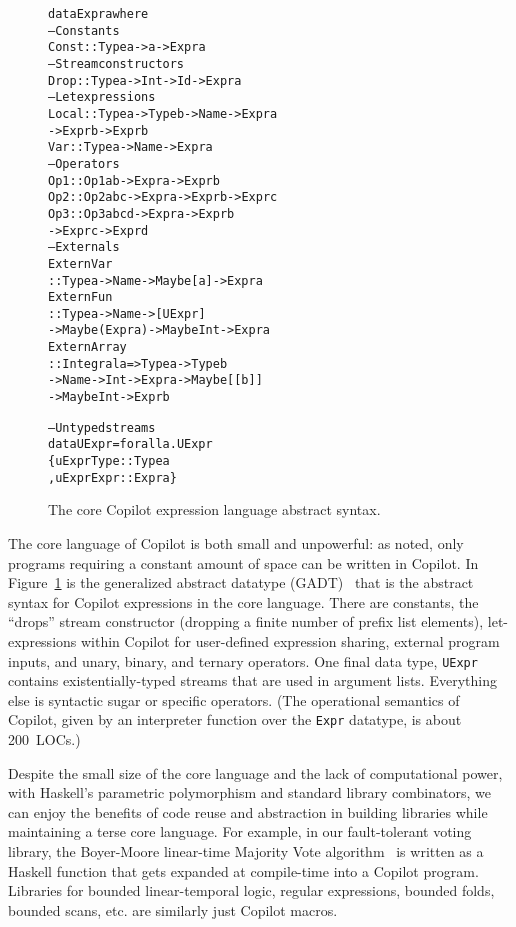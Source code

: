 \documentclass[9pt]{sigplanconf}
\newenvironment{code}{\begin{alltt}\footnotesize}{\end{alltt}}
\begin{document}
\begin{figure}[h!t]
  \begin{code}
data Expr a where
  -- Constants
  Const :: Type a -> a -> Expr a
  -- Stream constructors
  Drop  :: Type a -> Int -> Id -> Expr a
  -- Let expressions
  Local :: Type a -> Type b -> Name -> Expr a 
        -> Expr b -> Expr b
  Var   :: Type a -> Name -> Expr a 
  -- Operators
  Op1   :: Op1 a b -> Expr a -> Expr b 
  Op2   :: Op2 a b c -> Expr a -> Expr b -> Expr c
  Op3   :: Op3 a b c d -> Expr a -> Expr b 
        -> Expr c -> Expr d
  -- Externals
  ExternVar   
    :: Type a -> Name -> Maybe [a] -> Expr a 
  ExternFun   
    :: Type a -> Name -> [UExpr] 
    -> Maybe (Expr a) -> Maybe Int -> Expr a
  ExternArray 
    :: Integral a => Type a -> Type b 
    -> Name -> Int -> Expr a -> Maybe [[b]] 
    -> Maybe Int -> Expr b 

-- Untyped streams
data UExpr = forall a. UExpr
  \{ uExprType :: Type a
  , uExprExpr  :: Expr a \}
  \end{code}
\caption{The core Copilot expression language abstract syntax.\label{fig:core}}
\end{figure} 

The core language of Copilot is both small and unpowerful: as noted, only
programs requiring a constant amount of space can be written in Copilot.  In
Figure~\ref{fig:core} is the generalized abstract datatype (GADT)~\cite{gadts}
that is the abstract syntax for Copilot expressions in the core language.  There
are constants, the ``drops'' stream constructor (dropping a finite number of
prefix list elements), let-expressions within Copilot for user-defined
expression sharing, external program inputs, and unary, binary, and ternary
operators.  One final data type, {\tt UExpr} contains existentially-typed
streams that are used in argument lists.  Everything else is syntactic sugar or
specific operators.  (The operational semantics of Copilot, given by an
interpreter function over the {\tt Expr} datatype, is about 200~LOCs.)

Despite the small size of the core language and the lack of computational power,
with Haskell's parametric polymorphism and standard library combinators, we can
enjoy the benefits of code reuse and abstraction in building libraries while
maintaining a terse core language.  For example, in our fault-tolerant voting
library, the Boyer-Moore linear-time Majority Vote algorithm~\cite{mjrty} is
written as a Haskell function that gets expanded at compile-time into a Copilot
program.  Libraries for bounded linear-temporal logic, regular expressions,
bounded folds, bounded scans, etc. are similarly just Copilot macros.
\end{document}
